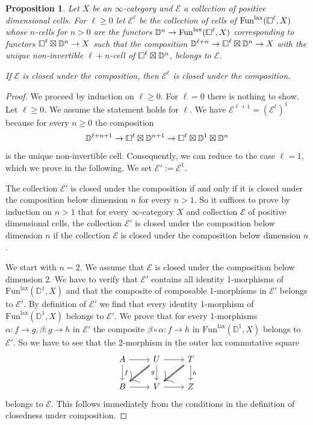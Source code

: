 \documentclass[10pt,oneside]{article}
\numberwithin{equation}{section} %
\numberwithin{figure}{section} %
\theoremstyle{plain}
\newtheorem{proposition}[theorem]{Proposition}
\theoremstyle{definition}
\newcommand{\bD}{{\mathbb D}}
\newcommand{\mE}{{\mathcal E}}
\newcommand{\Fun}{\mathrm{Fun}}
\newcommand{\lax}{{\mathrm{lax}}}
\newcommand{\cube}{{\,\vline\negmedspace\square}}
\begin{document}
\begin{proposition}\label{inheri} Let $X$ be an $\infty$-category and $\mE$ a collection of positive dimensional cells.
For $\ell \geq 0$ let $\mE^\ell$ be the collection of cells of $\Fun^\lax(\cube^\ell, X)$ whose $n$-cells for $n > 0$ are the functors $\bD^n \to \Fun^\lax(\cube^\ell, X)$ corresponding to functors $\cube^\ell \boxtimes \bD^n \to X$ such that the composition 
$\bD^{\ell +n} \to \cube^\ell \boxtimes \bD^n \to X$ with the unique non-invertible $\ell+n$-cell of $\cube^\ell \boxtimes \bD^n $, belongs to $\mE.$

If $\mE$ is closed under the composition, then 
$\mE^\ell $ is closed under the composition.

\end{proposition}

\begin{proof}

We proceed by induction on $\ell \geq 0.$ 
For $\ell=0 $ there is nothing to show. Let $\ell \geq 0. $ We assume the statement holds for $\ell.$
We have $\mE^{\ell+1}= (\mE^\ell)^1$ because for every $n \geq 0$ the composition
$$ \bD^{\ell+n+1} \to \cube^\ell \boxtimes \bD^{n+1} \to \cube^\ell \boxtimes \bD^1 \boxtimes \bD^n $$ is the unique non-invertible cell.
Consequently, we can reduce to the case $\ell=1,$ which we prove in the following.
We set $ \mE':= \mE^1. $ 

The collection $\mE'$ is closed under the composition if and only if it is closed under the composition below dimension $n$ for every $n > 1.$
So it suffices to prove by induction on $n > 1$ that for every $\infty$-category $X$ and collection $\mE$ of positive dimensional cells, the collection $\mE'$ is closed under the composition below dimension $n$ if the collection $\mE$ is closed under the composition below dimension $n$.

We start with $n=2$. We assume that $\mE$ is closed under the composition below dimension $2.$ We have to verify that $\mE'$ contains all identity 1-morphisms of $\Fun^\lax(\bD^1, X) $ and that the composite of composable 1-morphisms in $\mE'$ belongs to $\mE'.$
By definition of $\mE'$ we find that every identity 1-morphism of $\Fun^\lax(\bD^1, X) $ belongs to $\mE'$. 
We prove that for every 1-morphisms $\alpha: f \to g, \beta: g \to h $ in $\mE'$ the composite $\beta \circ \alpha: f \to h$ in $\Fun^\lax(\bD^1, X)$ belongs to $\mE'$.
So we have to see that the 2-morphism in the outer lax commutative square
\[
\begin{tikzcd}
A \ar{d}{f} \ar{r} & U \ar[double]{dl}{}  \ar{r}{} \ar{d}[swap]{g} & T \ar[double]{dl}{} \ar{d}{h} \\
B \ar{r} & V  \ar{r}[swap]{} & Z
\end{tikzcd}
\]
belongs to $\mE$.
This follows immediately from the conditions in the definition of closedness under composition.


\end{proof}
\end{document}
